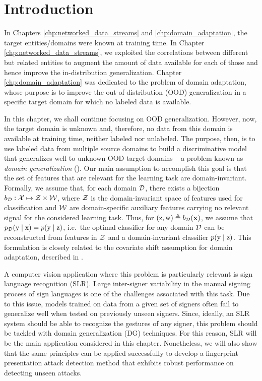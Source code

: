 \section{Introduction}
\label{sec:chp4_intro}
In Chapters \ref{chp:networked_data_streams} and \ref{chp:domain_adaptation}, the target entities/domains were known at training time. In Chapter \ref{chp:networked_data_streams}, we exploited the correlations between different but related entities to augment the amount of data available for each of those and hence improve the in-distribution generalization. Chapter \ref{chp:domain_adaptation} was dedicated to the problem of domain adaptation, whose purpose is to improve the out-of-distribution (OOD) generalization in a specific target domain for which no labeled data is available.

In this chapter, we shall continue focusing on OOD generalization. However, now, the target domain is unknown and, therefore, no data from this domain is available at training time, neither labeled nor unlabeled. The purpose, then, is to use labeled data from multiple source domains to build a discriminative model that generalizes well to unknown OOD target domains -- a problem known as \emph{domain generalization} (\citet{Blanchard2011, Muandet2013}). Our main assumption to accomplish this goal is that the set of features that are relevant for the learning task are domain-invariant. Formally, we assume that, for each domain ${\mathcal{D}}$, there exists a bijection $b_{\mathcal{D}}: {\mathcal{X}} \mapsto {\mathcal{Z}} \times {\mathcal{W}}$, where ${\mathcal{Z}}$ is the domain-invariant space of features used for classification and ${\mathcal{W}}$ are domain-specific auxiliary features carrying no relevant signal for the considered learning task. Thus, for $({\textnormal{z}}, {\textnormal{w}}) \triangleq b_{\mathcal{D}}({\mathbf{x}})$, we assume that $p_{\mathcal{D}}({\textnormal{y}} \mid {\textnormal{x}}) = p({\textnormal{y}} \mid {\textnormal{z}})$, i.e.\ the optimal classifier for any domain ${\mathcal{D}}$ can be reconstructed from features in ${\mathcal{Z}}$ and a domain-invariant classifier $p({\textnormal{y}} \mid {\textnormal{z}})$.  This formulation is closely related to the covariate shift assumption for domain adaptation, described in .

A computer vision application where this problem is particularly relevant is sign language recognition (SLR). Large inter-signer variability in the manual signing process of sign languages is one of the challenges associated with this task. Due to this issue, models trained on data from a given set of signers often fail to generalize well when tested on previously unseen signers. Since, ideally, an SLR system should be able to recognize the gestures of any signer, this problem should be tackled with domain generalization (DG) techniques. For this reason, SLR will be the main application considered in this chapter. Nonetheless, we will also show that the same principles can be applied successfully to develop a fingerprint presentation attack detection method that exhibits robust performance on detecting unseen attacks.

